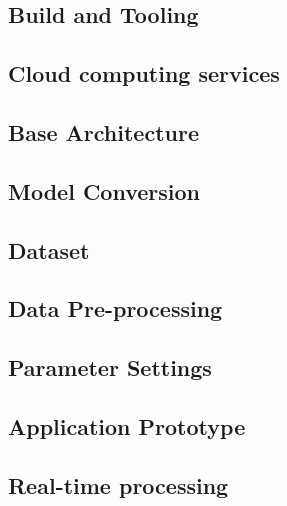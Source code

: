     \subsection{Build and Tooling}
\subsection{Cloud computing services}

    \subsection{Base Architecture}
    \subsection{Model Conversion}
    \subsection{Dataset}
    \subsection{Data Pre-processing}
    \subsection{Parameter Settings}
    \subsection{Application Prototype}
\subsection{Real-time processing}
\fi
